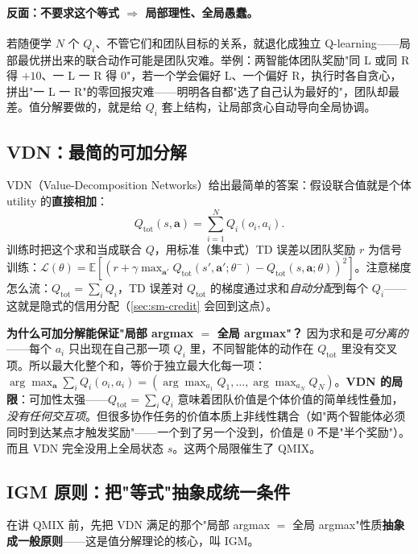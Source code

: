 \paragraph{反面：不要求这个等式 $\Rightarrow$ 局部理性、全局愚蠢。}
若随便学 $N$ 个 $Q_i$、不管它们和团队目标的关系，就退化成独立 Q-learning——局部最优拼出来的联合动作可能是团队灾难。举例：两智能体团队奖励"同 L 或同 R 得 $+10$、一 L 一 R 得 $0$"，若一个学会偏好 L、一个偏好 R，执行时各自贪心，拼出"一 L 一 R"的零回报灾难——明明各自都"选了自己认为最好的"，团队却最差。值分解要做的，就是给 $Q_i$ 套上结构，让局部贪心自动导向全局协调。

\subsection{VDN：最简的可加分解}

VDN（Value-Decomposition Networks）\cite{sunehag2018vdn}给出最简单的答案：假设联合值就是个体 utility 的\textbf{直接相加}：
\begin{equation}
  Q_{\text{tot}}(s,\mathbf{a})=\sum_{i=1}^N Q_i(o_i,a_i).
  \label{eq:sm-vdn}
\end{equation}
训练时把这个求和当成联合 $Q$，用标准（集中式）TD 误差以团队奖励 $r$ 为信号训练：$\mathcal{L}(\theta)=\mathbb{E}[(r+\gamma\max_{\mathbf{a}'}Q_{\text{tot}}(s',\mathbf{a}';\theta^-)-Q_{\text{tot}}(s,\mathbf{a};\theta))^2]$。注意梯度怎么流：$Q_{\text{tot}}=\sum_i Q_i$，TD 误差对 $Q_{\text{tot}}$ 的梯度通过求和\emph{自动分配}到每个 $Q_i$——这就是隐式的信用分配（\cref{sec:sm-credit} 会回到这点）。

\textbf{为什么可加分解能保证"局部 argmax $=$ 全局 argmax"？} 因为求和是\emph{可分离的}——每个 $a_i$ 只出现在自己那一项 $Q_i$ 里，不同智能体的动作在 $Q_{\text{tot}}$ 里没有交叉项。所以最大化整个和，等价于独立最大化每一项：$\arg\max_{\mathbf{a}}\sum_i Q_i(o_i,a_i)=(\arg\max_{a_1}Q_1,\dots,\arg\max_{a_N}Q_N)$。\textbf{VDN 的局限}：可加性太强——$Q_{\text{tot}}=\sum_i Q_i$ 意味着团队价值是个体价值的简单线性叠加，\emph{没有任何交互项}。但很多协作任务的价值本质上非线性耦合（如"两个智能体必须同时到达某点才触发奖励"——一个到了另一个没到，价值是 0 不是"半个奖励"）。而且 VDN 完全没用上全局状态 $s$。这两个局限催生了 QMIX。

\subsection{IGM 原则：把"等式"抽象成统一条件}

在讲 QMIX 前，先把 VDN 满足的那个"局部 argmax $=$ 全局 argmax"性质\textbf{抽象成一般原则}——这是值分解理论的核心，叫 IGM。

